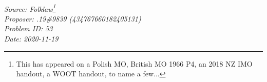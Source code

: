 \SSbreak\\
\emph{Source: Folklaw\footnote{This has appeared on a Polish MO, British MO 1966 P4, an 2018 NZ IMO handout, a WOOT handout, to name a few...}}\\
\emph{Proposer: .19\#9839 (434767660182405131)}\\
\emph{Problem ID: 53}\\
\emph{Date: 2020-11-19}\\
\SSbreak

\bigskip

